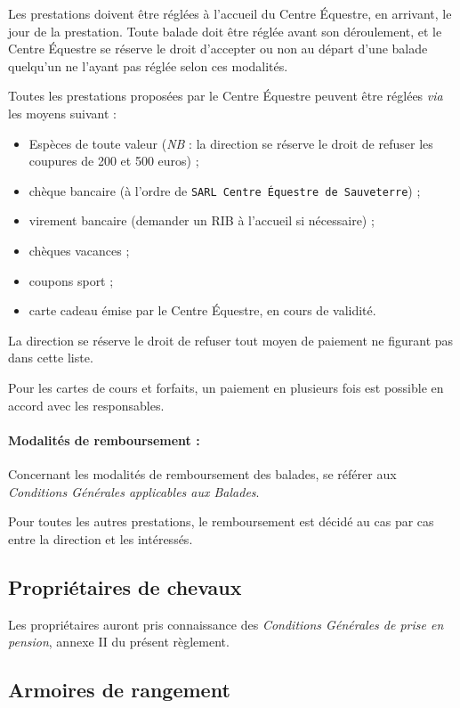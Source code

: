 \documentclass[11pt,a4paper]{article}
\begin{document}
Les prestations doivent être réglées à l'accueil du Centre Équestre, en arrivant, le jour de la prestation.
Toute balade doit être réglée avant son déroulement, et le Centre Équestre se réserve le droit d'accepter ou non au départ d'une balade quelqu'un ne l'ayant pas réglée selon ces modalités.

Toutes les prestations proposées par le Centre Équestre peuvent être réglées \textit{via} les moyens suivant :
\begin{itemize}[leftmargin=50pt]
  \item
  Espèces de toute valeur (\textit{NB} : la direction se réserve le droit de refuser les coupures de 200 et 500 euros) ;
  \item
  chèque bancaire (à l'ordre de \texttt{SARL Centre Équestre de Sauveterre}) ;
  \item
  virement bancaire (demander un RIB à l'accueil si nécessaire) ;
  \item
  chèques vacances ;
  \item
  coupons sport ;
	\item carte cadeau émise par le Centre Équestre, en cours de validité.
\end{itemize}

La direction se réserve le droit de refuser tout moyen de paiement ne figurant pas dans cette liste.

Pour les cartes de cours et forfaits, un paiement en plusieurs fois est possible en accord avec les responsables.

\paragraph{Modalités de remboursement :\\}
Concernant les modalités de remboursement des balades, se référer aux \textit{Conditions Générales applicables aux Balades}.

Pour toutes les autres prestations, le remboursement est décidé au cas par cas entre la direction et les intéressés.


\subsection{Propriétaires de chevaux}
Les propriétaires auront pris connaissance des \textit{Conditions Générales de prise en pension}, annexe II du présent règlement.


\subsection{Armoires de rangement}
\end{document}
